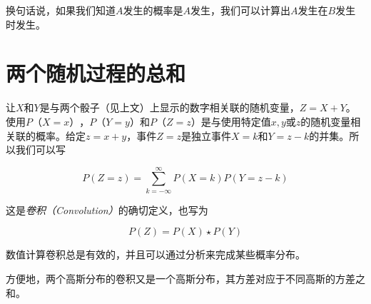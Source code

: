 
换句话说，如果我们知道$A$发生的概率是$A$发生，我们可以计算出$A$发生在$B$发生时发生。


\section{两个随机过程的总和}
\label{sec:convolution}
让$X$和$Y$是与两个骰子（见上文）上显示的数字相关联的随机变量，$Z=X+Y$。使用$P（X=x）$，$P（Y=y）$和$P（Z=z）$是与使用特定值$x,y$或$z$的随机变量相关联的概率。给定$z=x+y$，事件$Z=z$是独立事件$X=k$和$Y=z-k$的并集。所以我们可以写

\begin{equation}
P(Z=z)=\sum_{k=-\infty}^{\infty}P(X=k)P(Y=z-k)
\end{equation}


这是\emph{卷积（Convolution）}的确切定义，也写为

\begin{equation}
P(Z)=P(X)\star P(Y)
\end{equation}



数值计算卷积总是有效的，并且可以通过分析来完成某些概率分布。

方便地，两个高斯分布的卷积又是一个高斯分布，其方差对应于不同高斯的方差之和。


